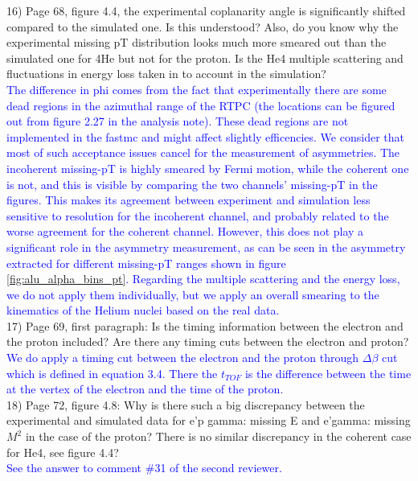 16) Page 68, figure 4.4, the experimental coplanarity angle is significantly 
shifted compared to the simulated one. Is this understood? Also, do you know 
why the experimental missing pT distribution looks much more smeared out than 
the simulated one for 4He but not for the proton. Is the He4 multiple 
scattering and fluctuations in energy loss taken in to account in the 
simulation?  \\
\textcolor{blue}{ The difference in phi comes from the fact that experimentally 
there are some dead regions in the azimuthal range of the RTPC (the locations 
can be figured out from figure 2.27 in the analysis note). These dead regions 
are not implemented in the fastmc and might affect slightly efficencies. We 
consider that most of such acceptance issues cancel for the measurement of 
asymmetries.
The incoherent missing-pT is highly smeared by Fermi motion, while the coherent 
one is not, and this is visible by comparing the two channels' missing-pT in 
the figures.  This makes its agreement between experiment and simulation less 
sensitive to resolution for the incoherent channel, and probably related to the 
worse agreement for the coherent channel.
However, this does not play a significant role in the asymmetry
measurement, as can be seen in the asymmetry extracted for different
missing-pT ranges shown in figure \ref{fig:alu_alpha_bins_pt}.  Regarding the 
multiple scattering and the energy loss, we do not apply them individually, but 
we apply an overall smearing to the kinematics of the Helium nuclei based on 
the real data.} \\

17) Page 69, first paragraph:  Is the timing information between the electron 
and the proton included? Are there any timing cuts between the electron and 
proton? \\
\textcolor{blue}{ We do apply a timing cut between the electron and the proton 
   through $\Delta \beta$ cut which is defined in equation 3.4. There the 
   $t_{TOF}$ is the difference between the time at the vertex of the electron 
and the time of the proton.}\\  

18) Page 72, figure 4.8: Why is there such a big discrepancy between the 
experimental and simulated data for e'p gamma: missing E  and  e'gamma: missing 
$M^{2}$ in the case of the proton?  There is no similar discrepancy in the 
coherent case for He4, see figure 4.4?  \\
\textcolor{blue}{ See the answer to comment \#31 of the second reviewer.}\\

